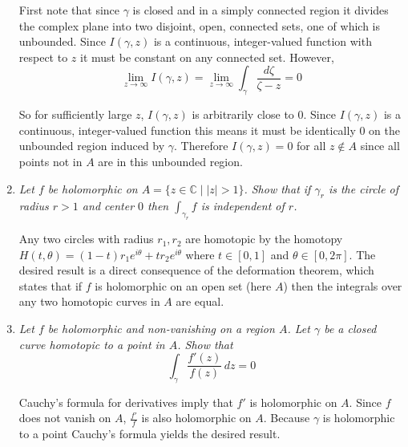 \documentclass[letterpaper, 11pt]{article}
\newcommand{\C}{\mathbb{C}}
\begin{document}
\begin{enumerate}
First note that since $\gamma$ is closed and in a simply connected region it divides the complex plane into two disjoint, open, connected sets, one of which is unbounded.  Since $I(\gamma, z)$ is a continuous, integer-valued function with respect to $z$ it must be constant on any connected set.  However,
\[
\lim_{z \rightarrow \infty} I(\gamma,z) = \lim_{z \rightarrow \infty} \int_{\gamma} \frac{d\zeta}{\zeta - z} = 0
\]

So for sufficiently large $z$, $I(\gamma, z)$ is arbitrarily close to $0$.  Since $I(\gamma, z)$ is a continuous, integer-valued function this means it must be identically $0$ on the unbounded region induced by $\gamma$.  Therefore $I(\gamma, z) = 0$ for all $z \notin A$ since all points not in $A$ are in this unbounded region.

\item \emph{Let $f$ be holomorphic on $A = \{z \in \C \mid |z| > 1\}$.  Show that if $\gamma_r$ is the circle of radius $r > 1$ and center $0$ then $\int_{\gamma_r} f$ is independent of $r$.}

Any two circles with radius $r_1, r_2$ are homotopic by the homotopy $H(t,\theta) = (1-t)r_1e^{i\theta} + tr_2e^{i\theta}$ where $t \in [0,1]$ and $\theta \in [0,2\pi]$.  The desired result is a direct consequence of the deformation theorem, which states that if $f$ is holomorphic on an open set (here $A$) then the integrals over any two homotopic curves in $A$ are equal.

\item \emph{Let $f$ be holomorphic and non-vanishing on a region $A$.  Let $\gamma$ be a closed curve homotopic to a point in $A$.  Show that $$\int_{\gamma} \frac{f'(z)}{f(z)}\,dz = 0$$}

Cauchy's formula for derivatives imply that $f'$ is holomorphic on $A$.  Since $f$ does not vanish on $A$, $\frac{f'}{f}$ is also holomorphic on $A$.  Because $\gamma$ is holomorphic to a point Cauchy's formula yields the desired result.

\end{enumerate}
\end{document}

